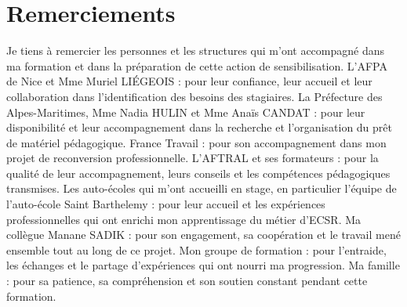 \chapter{Remerciements}
Je tiens à remercier les personnes et les structures qui m’ont accompagné dans ma formation et dans la préparation de cette action de sensibilisation. L’AFPA de Nice et Mme Muriel LIÉGEOIS : pour leur confiance, leur accueil et leur collaboration dans l’identification des besoins des stagiaires. La Préfecture des Alpes-Maritimes, Mme Nadia HULIN et Mme Anaïs CANDAT : pour leur disponibilité et leur accompagnement dans la recherche et l’organisation du prêt de matériel pédagogique. France Travail : pour son accompagnement dans mon projet de reconversion professionnelle. L’AFTRAL et ses formateurs : pour la qualité de leur accompagnement, leurs conseils et les compétences pédagogiques transmises. Les auto-écoles qui m’ont accueilli en stage, en particulier l’équipe de l’auto-école Saint Barthelemy : pour leur accueil et les expériences professionnelles qui ont enrichi mon apprentissage du métier d’ECSR. Ma collègue Manane SADIK : pour son engagement, sa coopération et le travail mené ensemble tout au long de ce projet. Mon groupe de formation : pour l’entraide, les échanges et le partage d’expériences qui ont nourri ma progression. Ma famille : pour sa patience, sa compréhension et son soutien constant pendant cette formation.
